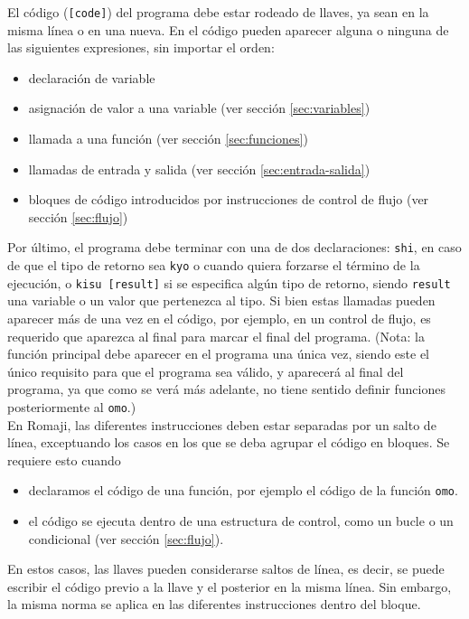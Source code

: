 \documentclass[spanish]{article}
\begin{document}
El código (\texttt{[code]}) del programa debe estar rodeado de llaves, ya sean en la misma línea o en una nueva. En el código pueden aparecer alguna o ninguna de las siguientes expresiones, sin importar el orden:
\begin{itemize}
  \item{declaración de variable}
  \item{asignación de valor a una variable (ver sección \ref{sec:variables})}
  \item{llamada a una función (ver sección \ref{sec:funciones})}
  \item{llamadas de entrada y salida (ver sección \ref{sec:entrada-salida})}
  \item{bloques de código introducidos por instrucciones de control de flujo (ver sección \ref{sec:flujo})}
\end{itemize}
Por último, el programa debe terminar con una de dos declaraciones: \texttt{shi}, en caso de que el tipo de retorno sea \texttt{kyo} o cuando quiera forzarse el término de la ejecución, o \texttt{kisu [result]} si se especifica algún tipo de retorno, siendo \texttt{result} una variable o un valor que pertenezca al tipo. Si bien estas llamadas pueden aparecer más de una vez en el código, por ejemplo, en un control de flujo, es requerido que aparezca al final para marcar el final del programa. (Nota: la función principal debe aparecer en el programa una única vez, siendo este el único requisito para que el programa sea válido, y aparecerá al final del programa, ya que como se verá más adelante, no tiene sentido definir funciones posteriormente al \texttt{omo}.)\\

En Romaji, las diferentes instrucciones deben estar separadas por un salto de línea, exceptuando los casos en los que se deba agrupar el código en bloques. Se requiere esto cuando
\begin{itemize}
  \item{declaramos el código de una función, por ejemplo el código de la función \texttt{omo}.}
  \item{el código se ejecuta dentro de una estructura de control, como un bucle o un condicional (ver sección \ref{sec:flujo}).}
\end{itemize}
En estos casos, las llaves pueden considerarse saltos de línea, es decir, se puede escribir el código previo a la llave y el posterior en la misma línea. Sin embargo, la misma norma se aplica en las diferentes instrucciones dentro del bloque.\\
\end{document}
